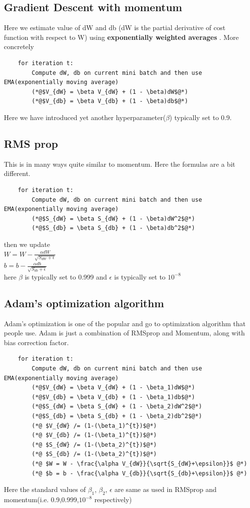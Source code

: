 \documentclass[12pt]{article}
\begin{document}
\subsection{Gradient Descent with momentum}
Here we estimate value of dW and db (dW is the partial derivative of cost function with respect to W) using \textbf{exponentially weighted averages} . More concretely 
\begin{lstlisting}
    for iteration t: 
        Compute dW, db on current mini batch and then use EMA(exponentially moving average) 
        (*@$V_{dW} = \beta V_{dW} + (1 - \beta)dW$@*)
        (*@$V_{db} = \beta V_{db} + (1 - \beta)db$@*)
\end{lstlisting}
Here we have introduced yet another hyperparameter($\beta$) typically set to 0.9.
\subsection{RMS prop}
This is in many ways quite similar to momentum. Here the formulas are a bit different. \\
\begin{lstlisting}
    for iteration t: 
        Compute dW, db on current mini batch and then use EMA(exponentially moving average) 
        (*@$S_{dW} = \beta S_{dW} + (1 - \beta)dW^2$@*)
        (*@$S_{db} = \beta S_{db} + (1 - \beta)db^2$@*)
\end{lstlisting} 
then we update \\ 
$W = W - \frac{\alpha dW}{\sqrt{S_{dW}+\epsilon}}$ \\ 
$b = b - \frac{\alpha db}{\sqrt{S_{db}+\epsilon}}$ \\
here $\beta$ is typically set to 0.999 and $\epsilon$ is typically set to $10^{-8}$
\subsection{Adam's optimization algorithm}
Adam's optimization is one of the popular and go to optimization algorithm that people use. Adam is just a combination of RMSprop and Momentum, along with bias correction factor.
\begin{lstlisting}
    for iteration t: 
        Compute dW, db on current mini batch and then use EMA(exponentially moving average) 
        (*@$V_{dW} = \beta V_{dW} + (1 - \beta_1)dW$@*)
        (*@$V_{db} = \beta V_{db} + (1 - \beta_1)db$@*)
        (*@$S_{dW} = \beta S_{dW} + (1 - \beta_2)dW^2$@*)
        (*@$S_{db} = \beta S_{db} + (1 - \beta_2)db^2$@*)
        (*@ $V_{dW} /= (1-(\beta_1)^{t})$@*)
        (*@ $V_{db} /= (1-(\beta_1)^{t})$@*)
        (*@ $S_{dW} /= (1-(\beta_2)^{t})$@*)
        (*@ $S_{db} /= (1-(\beta_2)^{t})$@*)
        (*@ $W = W - \frac{\alpha V_{dW}}{\sqrt{S_{dW}+\epsilon}}$ @*)
        (*@ $b = b - \frac{\alpha V_{db}}{\sqrt{S_{db}+\epsilon}}$ @*)
\end{lstlisting} 
Here the standard values of $\beta_1$, $\beta_2$, $\epsilon$ are same as used in RMSprop and momentum(i.e. 0.9,0.999,$10^{-8}$ respectively)
\end{document}
